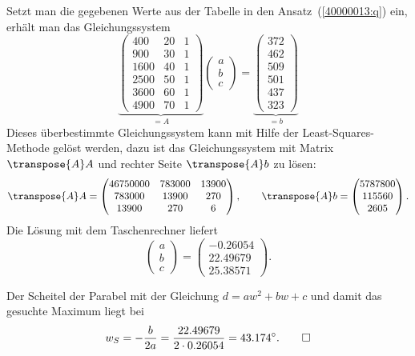 \begin{loesung}
\begin{teilaufgaben}
\item
Setzt man die gegebenen Werte aus der Tabelle in den Ansatz~(\ref{40000013:q})
ein, erhält man das Gleichungssystem
\[
\underbrace{
\begin{pmatrix}
 400&20&1\\
 900&30&1\\
1600&40&1\\
2500&50&1\\
3600&60&1\\
4900&70&1
\end{pmatrix}}_{\displaystyle = A}
\begin{pmatrix}
a\\
b\\
c
\end{pmatrix}
=
\underbrace{
\begin{pmatrix}
372\\
462\\
509\\
501\\
437\\
323
\end{pmatrix}}_{\displaystyle = b}
\]
Dieses überbestimmte Gleichungssystem kann mit Hilfe der
Least-Squares-Methode gelöst werden, dazu ist das Gleichungssystem
mit Matrix $\transpose{A}A$ und rechter Seite $\transpose{A}b$ zu lösen:
\[
\transpose{A}A
=
\begin{pmatrix}
46750000&783000&13900\\
  783000& 13900&  270\\
   13900&   270&    6
\end{pmatrix},
\qquad
\transpose{A}b
=
\begin{pmatrix}
5787800\\
 115560\\
   2605
\end{pmatrix}.
\]
Die Lösung mit dem Taschenrechner liefert
\[
\begin{pmatrix}
a\\b\\c
\end{pmatrix}
=
\begin{pmatrix}
-0.26054\\
22.49679\\
25.38571
\end{pmatrix}.
\]
\item
Der Scheitel der Parabel mit der Gleichung $d=aw^2 + bw+c$
und damit das gesuchte Maximum liegt bei
\[
w_S=-\frac{b}{2a}=\frac{22.49679}{2\cdot 0.26054}=43.174^\circ.
\qedhere
\]
\end{teilaufgaben}
\end{loesung}

